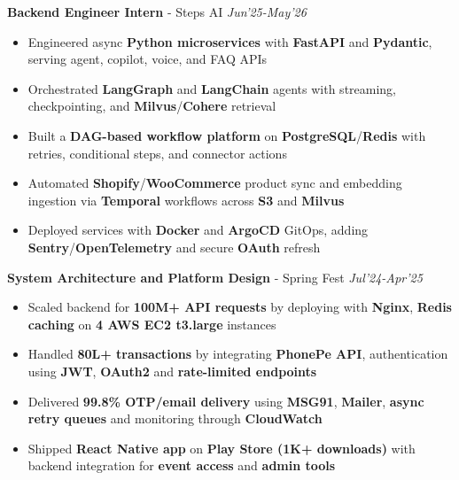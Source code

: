 \documentclass[10pt]{extarticle}
\begin{document}
\begin{center}
\textbf{Backend Engineer Intern} - Steps AI
\hfill\hfill\textit{Jun'25-May'26}
\end{center}
\vspace{-2mm}
\begin{itemize}[leftmargin=1.5mm, itemsep=0pt, topsep=0pt]
  \item Engineered async \textbf{Python microservices} with \textbf{FastAPI} and \textbf{Pydantic}, serving agent, copilot, voice, and FAQ APIs
  \item Orchestrated \textbf{LangGraph} and \textbf{LangChain} agents with streaming, checkpointing, and \textbf{Milvus}/\textbf{Cohere} retrieval
  \item Built a \textbf{DAG-based workflow platform} on \textbf{PostgreSQL}/\textbf{Redis} with retries, conditional steps, and connector actions
  \item Automated \textbf{Shopify}/\textbf{WooCommerce} product sync and embedding ingestion via \textbf{Temporal} workflows across \textbf{S3} and \textbf{Milvus}
  \item Deployed services with \textbf{Docker} and \textbf{ArgoCD} GitOps, adding \textbf{Sentry}/\textbf{OpenTelemetry} and secure \textbf{OAuth} refresh
\end{itemize}

\vspace{1mm}

\begin{center}
\textbf{System Architecture and Platform Design} - Spring Fest
\hfill\hfill\textit{Jul'24-Apr'25}
\end{center}
\vspace{-2mm}
\begin{itemize}[leftmargin=1.5mm, itemsep=0pt, topsep=0pt]
  \item Scaled backend for \textbf{100M+ API requests} by deploying with \textbf{Nginx}, \textbf{Redis caching} on \textbf{4 AWS EC2 t3.large} instances
  \item Handled \textbf{80L+ transactions} by integrating \textbf{PhonePe API}, authentication using \textbf{JWT}, \textbf{OAuth2} and \textbf{rate-limited endpoints}
  \item Delivered \textbf{99.8\% OTP/email delivery} using \textbf{MSG91}, \textbf{Mailer}, \textbf{async retry queues} and monitoring through \textbf{CloudWatch}
  \item Shipped \textbf{React Native app} on \textbf{Play Store (1K+ downloads)} with backend integration for \textbf{event access} and \textbf{admin tools}
\end{itemize}
\end{document}
